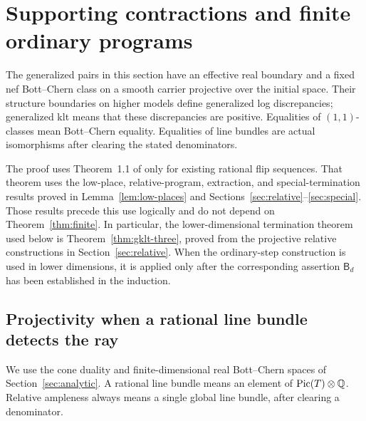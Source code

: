 \section{Supporting contractions and finite ordinary programs}
\label{sec:perturbation}\label{sec:contractions}

The generalized pairs in this section have an effective real boundary and
a fixed nef Bott--Chern class on a smooth carrier projective over the
initial space. Their structure boundaries on higher models define
generalized log discrepancies; generalized klt means that these
discrepancies are positive. Equalities of $(1,1)$-classes mean
Bott--Chern equality. Equalities of line bundles are actual isomorphisms
after clearing the stated denominators.

The proof uses Theorem~1.1 of \cite{OAI:Termination-of-generalized-log-canonical-flips-on-compact-Kahler-fourfolds-October-7-2026} only for existing
rational flip sequences. That theorem uses the low-place, relative-program,
extraction, and special-termination results proved in
Lemma~\ref{lem:low-places} and
Sections~\ref{sec:relative}--\ref{sec:special}. Those results precede
this use logically and do not depend on Theorem~\ref{thm:finite}.
In particular, the lower-dimensional
termination theorem used below is Theorem~\ref{thm:gklt-three}, proved
from the projective relative constructions in Section~\ref{sec:relative}.
When the ordinary-step construction is used in lower dimensions, it is
applied only after the corresponding assertion $\mathsf B_d$ has been
established in the induction.

\subsection{Projectivity when a rational line bundle detects the ray}

We use the cone duality and finite-dimensional real Bott--Chern
spaces of Section~\ref{sec:analytic}. A rational line bundle means an
element of $\operatorname{Pic}(T)\otimes\mathbb Q$. Relative ampleness always means a
single global line bundle, after clearing a denominator.

